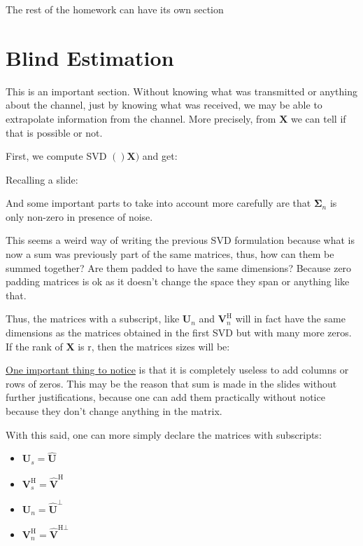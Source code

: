 \documentclass[12pt, a4paper]{article}
\begin{document}
The rest of the homework can have its own section

\section{Blind Estimation}

This is an important section. Without knowing what was transmitted or anything about the channel, just by knowing what was received, we may be able to extrapolate information from the channel. More precisely, from $\mathbf{X}$ we can tell if that is possible or not.

First, we compute SVD $()\mathbf{X})$ and get:


Recalling a slide:



And some important parts to take into account more carefully are that $\mathbf{\Sigma}_n$ is only non-zero in presence of noise.

This seems a weird way of writing the previous SVD formulation because what is now a sum was previously part of the same matrices, thus, how can them be summed together? Are them padded to have the same dimensions? Because zero padding matrices is ok as it doesn't change the space they span or anything like that.

Thus, the matrices with a subscript, like $\mathbf{U}_n$ and $\mathbf{V}^\text{H}_n$ will in fact have the same dimensions as the matrices obtained in the first SVD but with many more zeros. If the rank of $\mathbf{X}$ is r, then the matrices sizes will be:



\uline{One important thing to notice} is that it is completely useless to add columns or rows of zeros. This may be the reason that sum is made in the slides without further justifications, because one can add them practically without notice because they don't change anything in the matrix.

With this said, one can more simply declare the matrices with subscripts:

\begin{multicols}{2}
    \begin{itemize}    
        \item $\mathbf{U}_s = \mathbf{\hat{U}}$
        \item $\mathbf{V}_s^\text{H} = \mathbf{\hat{V}}^\text{H}$
        \item $\mathbf{U}_n = \mathbf{\hat{U}}^\perp$
        \item $\mathbf{V}_n^\text{H} = \mathbf{\hat{V}}^{\text{H}\perp}$
    \end{itemize}
\end{multicols}
\end{document}
